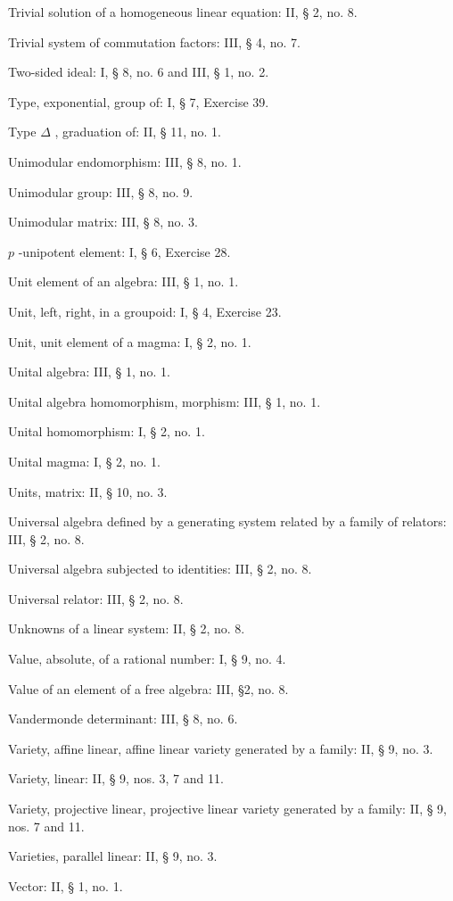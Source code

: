 Trivial solution of a homogeneous linear equation: II, § 2, no. 8.

Trivial system of commutation factors: III, § 4, no. 7.

Two-sided ideal: I, § 8, no. 6 and III, § 1, no. 2.

Type, exponential, group of: I, § 7, Exercise 39.

Type \(\Delta\) , graduation of: II, § 11, no. 1.

Unimodular endomorphism: III, § 8, no. 1.

Unimodular group: III, § 8, no. 9.

Unimodular matrix: III, § 8, no. 3.

\(p\) -unipotent element: I, § 6, Exercise 28.

Unit element of an algebra: III, § 1, no. 1.

Unit, left, right, in a groupoid: I, § 4, Exercise 23.

Unit, unit element of a magma: I, § 2, no. 1.

Unital algebra: III, § 1, no. 1.

Unital algebra homomorphism, morphism: III, § 1, no. 1.

Unital homomorphism: I, § 2, no. 1.

Unital magma: I, § 2, no. 1.

Units, matrix: II, § 10, no. 3.

Universal algebra defined by a generating system related by a family of relators: III, § 2, no. 8.

Universal algebra subjected to identities: III, § 2, no. 8.

Universal relator: III, § 2, no. 8.

Unknowns of a linear system: II, § 2, no. 8.

Value, absolute, of a rational number: I, § 9, no. 4.

Value of an element of a free algebra: III, §2, no. 8.

Vandermonde determinant: III, § 8, no. 6.

Variety, affine linear, affine linear variety generated by a family: II, § 9, no. 3.

Variety, linear: II, § 9, nos. 3, 7 and 11.

Variety, projective linear, projective linear variety generated by a family: II, § 9, nos. 7 and 11.

Varieties, parallel linear: II, § 9, no. 3.

Vector: II, § 1, no. 1.


